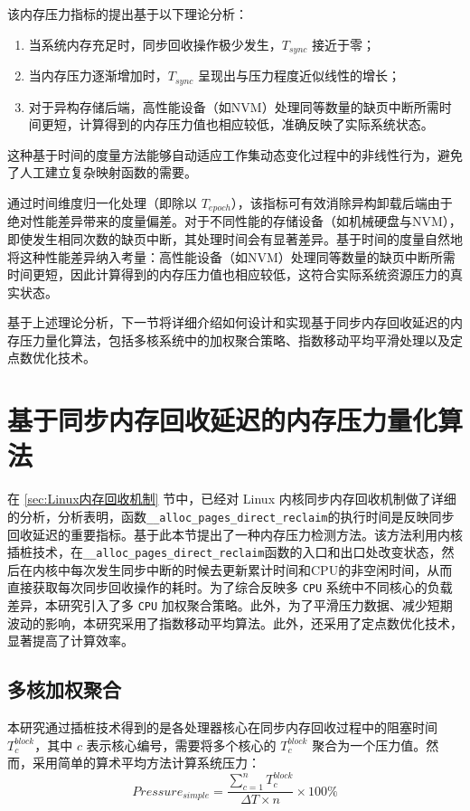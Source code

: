 该内存压力指标的提出基于以下理论分析：

\begin{enumerate}
    \item 当系统内存充足时，同步回收操作极少发生，$T_{sync}$ 接近于零；
    \item 当内存压力逐渐增加时，$T_{sync}$ 呈现出与压力程度近似线性的增长；
    \item 对于异构存储后端，高性能设备（如NVM）处理同等数量的缺页中断所需时间更短，计算得到的内存压力值也相应较低，准确反映了实际系统状态。
\end{enumerate}

这种基于时间的度量方法能够自动适应工作集动态变化过程中的非线性行为，避免了人工建立复杂映射函数的需要。

通过时间维度归一化处理（即除以 $T_{epoch}$），该指标可有效消除异构卸载后端由于绝对性能差异带来的度量偏差。对于不同性能的存储设备（如机械硬盘与NVM），即使发生相同次数的缺页中断，其处理时间会有显著差异。基于时间的度量自然地将这种性能差异纳入考量：高性能设备（如NVM）处理同等数量的缺页中断所需时间更短，因此计算得到的内存压力值也相应较低，这符合实际系统资源压力的真实状态。

基于上述理论分析，下一节将详细介绍如何设计和实现基于同步内存回收延迟的内存压力量化算法，包括多核系统中的加权聚合策略、指数移动平均平滑处理以及定点数优化技术。

\section{基于同步内存回收延迟的内存压力量化算法}
\label{sec:基于同步内存回收延迟的内存压力量化算法}

在 \ref{sec:Linux内存回收机制} 节中，已经对 Linux 内核同步内存回收机制做了详细的分析，分析表明，函数\texttt{\_\_alloc\_pages\_direct\_reclaim}的执行时间是反映同步回收延迟的重要指标。基于此本节提出了一种内存压力检测方法。该方法利用内核插桩技术，在\texttt{\_\_alloc\_pages\_direct\_reclaim}函数的入口和出口处改变状态，然后在内核中每次发生同步中断的时候去更新累计时间和CPU的非空闲时间，从而直接获取每次同步回收操作的耗时。为了综合反映多 \texttt{CPU} 系统中不同核心的负载差异，本研究引入了多 \texttt{CPU} 加权聚合策略。此外，为了平滑压力数据、减少短期波动的影响，本研究采用了指数移动平均算法。此外，还采用了定点数优化技术，显著提高了计算效率。

\subsection{多核加权聚合}
\label{sec:weighted_aggregation}
本研究通过插桩技术得到的是各处理器核心在同步内存回收过程中的阻塞时间 \(T_c^{block}\)，其中 \(c\) 表示核心编号，需要将多个核心的 \(T_c^{block}\) 聚合为一个压力值。然而，采用简单的算术平均方法计算系统压力：
\begin{equation}
    \label{eq:simple_average_pressure}
    Pressure_{simple} = \frac{\sum_{c=1}^{n} T_c^{block}}{\Delta T \times n} \times 100\%
\end{equation}

